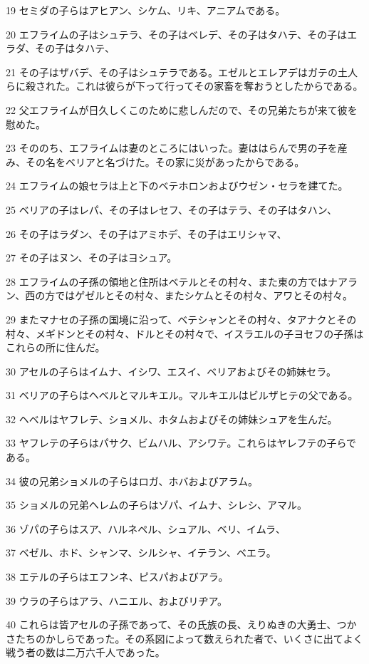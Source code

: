 \par 19 セミダの子らはアヒアン、シケム、リキ、アニアムである。
\par 20 エフライムの子はシュテラ、その子はベレデ、その子はタハテ、その子はエラダ、その子はタハテ、
\par 21 その子はザバデ、その子はシュテラである。エゼルとエレアデはガテの土人らに殺された。これは彼らが下って行ってその家畜を奪おうとしたからである。
\par 22 父エフライムが日久しくこのために悲しんだので、その兄弟たちが来て彼を慰めた。
\par 23 そののち、エフライムは妻のところにはいった。妻ははらんで男の子を産み、その名をベリアと名づけた。その家に災があったからである。
\par 24 エフライムの娘セラは上と下のベテホロンおよびウゼン・セラを建てた。
\par 25 ベリアの子はレパ、その子はレセフ、その子はテラ、その子はタハン、
\par 26 その子はラダン、その子はアミホデ、その子はエリシャマ、
\par 27 その子はヌン、その子はヨシュア。
\par 28 エフライムの子孫の領地と住所はベテルとその村々、また東の方ではナアラン、西の方ではゲゼルとその村々、またシケムとその村々、アワとその村々。
\par 29 またマナセの子孫の国境に沿って、ベテシャンとその村々、タアナクとその村々、メギドンとその村々、ドルとその村々で、イスラエルの子ヨセフの子孫はこれらの所に住んだ。
\par 30 アセルの子らはイムナ、イシワ、エスイ、ベリアおよびその姉妹セラ。
\par 31 ベリアの子らはヘベルとマルキエル。マルキエルはビルザヒテの父である。
\par 32 ヘベルはヤフレテ、ショメル、ホタムおよびその姉妹シュアを生んだ。
\par 33 ヤフレテの子らはパサク、ビムハル、アシワテ。これらはヤレフテの子らである。
\par 34 彼の兄弟ショメルの子らはロガ、ホバおよびアラム。
\par 35 ショメルの兄弟ヘレムの子らはゾパ、イムナ、シレシ、アマル。
\par 36 ゾパの子らはスア、ハルネペル、シュアル、ベリ、イムラ、
\par 37 ベゼル、ホド、シャンマ、シルシャ、イテラン、ベエラ。
\par 38 エテルの子らはエフンネ、ピスパおよびアラ。
\par 39 ウラの子らはアラ、ハニエル、およびリヂア。
\par 40 これらは皆アセルの子孫であって、その氏族の長、えりぬきの大勇士、つかさたちのかしらであった。その系図によって数えられた者で、いくさに出てよく戦う者の数は二万六千人であった。

